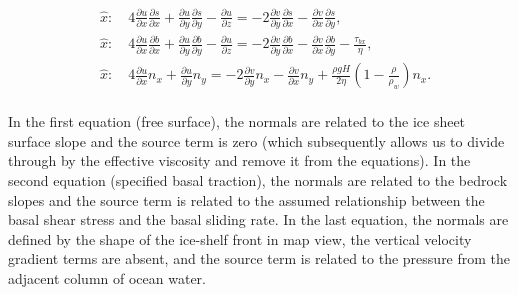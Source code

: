 \begin{align*}
  & \hat{x}:\quad 4\frac{\partial u}{\partial x}\frac{\partial s}{\partial x}+ \frac{\partial u}{\partial y}\frac{\partial s}{\partial y}-\frac{\partial u}{\partial z}=-2 \frac{\partial v}{\partial y}\frac{\partial s}{\partial x}-\frac{\partial v}{\partial x}\frac{\partial s}{\partial y}, \\ 
  & \hat{x}:\quad 4\frac{\partial u}{\partial x}\frac{\partial b}{\partial x}+\frac{\partial u}{\partial y}\frac{\partial b}{\partial y}-\frac{\partial u}{\partial z}=-2\frac{\partial v}{\partial y}\frac{\partial b}{\partial x}-\frac{\partial v}{\partial x}\frac{\partial b}{\partial y}-\frac{\tau _{bx}}{\eta }, \\ 
  & \hat{x}:\quad 4\frac{\partial u}{\partial x}n_{x}+\frac{\partial u}{\partial y}n_{y}=-2\frac{\partial v}{\partial y}n_{x}-\frac{\partial v}{\partial x}n_{y}+\frac{\rho gH}{2\eta }\left( 1-\frac{\rho }{\rho _{w}} \right)n_{x}. \\
\end{align*}

In the first equation (free surface), the normals are related to the ice sheet surface slope and the source term is zero (which subsequently allows us to divide through by the effective viscosity and remove it from the equations). In the second equation (specified basal traction), the normals are related to the bedrock slopes and the source term is related to the assumed relationship between the basal shear stress and the basal sliding rate. In the last equation, the normals are defined by the shape of the ice-shelf front in map view, the vertical velocity gradient terms are absent, and the source term is related to the pressure from the adjacent column of ocean water.
